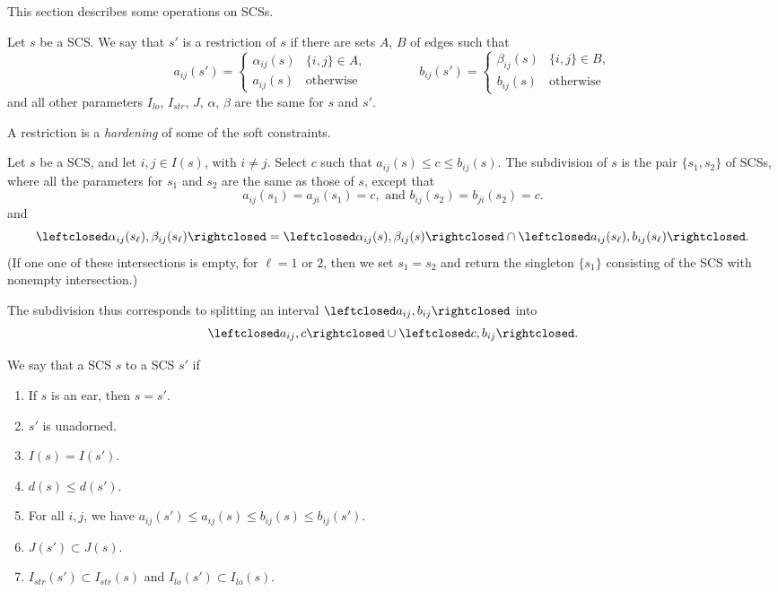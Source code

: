 This section describes some operations on SCSs.

\begin{definition}[restriction]
Let $s$ be a SCS.
We say that $s'$ is a restriction of $s$ if there are sets $A$, $B$ of
edges such that
\[
a_{ij}(s') = 
\begin{cases}
 \alpha_{ij}(s) & \{i,j\}\in A,\\
  a_{ij}(s) & \text{otherwise}
  \end{cases}
  \qquad\qquad
b_{ij}(s') = 
\begin{cases} \beta_{ij}(s) & \{i,j\}\in B,\\
  b_{ij}(s) & \text{otherwise}
\end{cases}
\]
and all other parameters $I_{lo}$, $I_{str}$, $J$, $\alpha$, $\beta$
are
the same for $s$ and $s'$.
\end{definition}

A restriction is a {\it hardening} of some of the soft constraints.

\begin{definition}[subdivision] 
Let $s$ be a SCS,
and let $i,j\in  I(s)$, with $i\ne j$.  Select $c$ such that $a_{ij}(s)\le c\le b_{ij}(s)$.
The subdivision of $s$ is the pair $\{s_1,s_2\}$ 
of SCSs, where all the parameters for $s_1$ and $s_2$
are the same as those of $s$, except that
\[
a_{ij}(s_1)=a_{ji}(s_1) = c, \text{ and } b_{ij}(s_2) = b_{ji}(s_2)=c.
\]
and
\[
\leftclosed\alpha_{ij}(s_\ell),\beta_{ij}(s_\ell)\rightclosed =
\leftclosed\alpha_{ij}(s),\beta_{ij}(s)\rightclosed\cap
\leftclosed a_{ij}(s_\ell),b_{ij}(s_\ell)\rightclosed.
\]
(If one one of these intersections is empty, for $\ell=1$ or $2$,  then we set $s_1=s_2$ and
return the singleton $\{s_1\}$ consisting of the SCS  with nonempty intersection.)
\end{definition}
The subdivision thus corresponds to splitting an interval 
$\leftclosed a_{ij},b_{ij}\rightclosed$ into
\[
\leftclosed a_{ij},c\rightclosed \cup \leftclosed c,b_{ij}\rightclosed.
\]



\begin{definition}  
We say that a SCS $s$
 to a SCS $s'$ if
\begin{enumerate}
\item If $s$ is an ear, then $s=s'$.
\item $s'$ is unadorned.
\item $I(s) = I(s')$.
\item $d(s)\le d(s')$.
\item For all $i,j$, we have $a_{ij}(s')\le a_{ij}(s)\le b_{ij}(s)\le b_{ij}(s')$.
\item $J(s')\subset J(s)$.
\item $I_{str}(s')\subset I_{str}(s)$  and
$I_{lo}(s')\subset I_{lo}(s)$.
\end{enumerate}
\end{definition}




